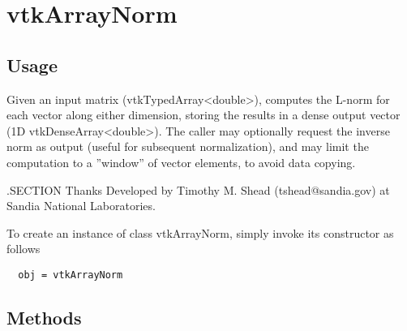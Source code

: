 \section{vtkArrayNorm}

\subsection{Usage}

 Given an input matrix (vtkTypedArray<double>), computes the L-norm for each
 vector along either dimension, storing the results in a dense output
 vector (1D vtkDenseArray<double>).  The caller may optionally request the
 inverse norm as output (useful for subsequent normalization), and may limit
 the computation to a ''window'' of vector elements, to avoid data copying.

 .SECTION Thanks
 Developed by Timothy M. Shead (tshead@sandia.gov) at Sandia National Laboratories.

To create an instance of class vtkArrayNorm, simply
invoke its constructor as follows
\begin{verbatim}
  obj = vtkArrayNorm
\end{verbatim}
\subsection{Methods}

